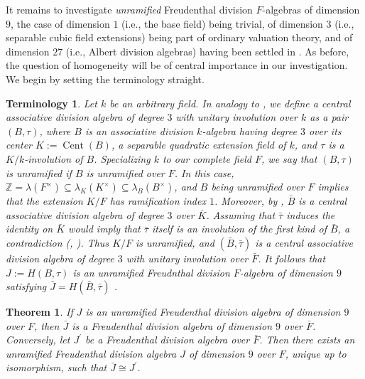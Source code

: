\documentclass{amsart}
\newtheorem{ter}[equation]{Terminology}
\newtheorem{thm}[equation]{Theorem}
\theoremstyle{definition} %
\theoremstyle{remark} %
\DeclareMathOperator{\Cent}{Cent}
\newcommand{\ZZ}{\mathbb{Z}}
\newcommand{\IZ}{\ZZ}
\renewcommand{\:}{\colon\,}
\numberwithin{equation}{section}
\begin{document}
It remains to investigate \emph{unramified} Freudenthal division $F$-algebras of dimension $9$, the case of dimension $1$ (i.e., the base field) being trivial, of dimension $3$ (i.e., separable cubic field extensions) being part of ordinary valuation theory, and of dimension $27$ (i.e., Albert division algebras) having been settled in \cite{MR0379620}. As before, the question of homogeneity will be of central importance in our investigation. We begin by setting the terminology straight.

\begin{ter} \label{t.CEASDI}
\emph{Let $k$ be an arbitrary field. In analogy to \cite[\S4]{MR0379620}, we define a central associative division algebra of degree $3$ with unitary involution over $k$ as a pair $(B,\tau)$, where $B$ is an associative division $k$-algebra having degree $3$ over its center $K := \Cent(B)$, a separable quadratic extension field of $k$, and $\tau$ is a $K/k$-involution of $B$. Specializing $k$ to our complete field $F$, we say that $(B,\tau)$ is \emph{unramified} if $B$ is unramified over $F$. In this case, $\IZ= \lambda(F^\times) \subseteq \lambda_K(K^\times) \subseteq \lambda_B(B^\times)$, and $B$ being unramified over $F$ implies that the extension $K/F$ has ramification index $1$. Moreover, by \cite[Satz~5.2]{MR0347922}, $\bar B$ is a central associative division algebra of degree $3$ over $\bar K$. Assuming that $\bar\tau$ induces the identity on $\bar K$ would imply that $\bar\tau$ itself is an involution of the first kind of $\bar B$, a contradiction (\cite[Chap.~8, Thm.~8.4]{MR770063}, \cite[Prop.~4.5.13]{GilleSz}). Thus $K/F$ is unramified, and $(\bar B,\bar\tau)$ is a central associative division algebra of degree $3$ with unitary involution over $\bar F$. It follows that $J := H(B,\tau)$ is an unramified Freudnthal division $F$-algebra of dimension $9$ satisfying $\bar J = H(\bar B,\bar\tau)$ \cite[Prop.~2]{MR0379620}}.
\end{ter}

\begin{thm} \label{t.UNRALI}
If $J$ is an unramified Freudenthal division algebra of dimension $9$ over $F$, then $\bar J$ is a Freudenthal division algebra of dimension $9$ over $\bar F$. Conversely, let $J^\prime$ be a Freudenthal division algebra over $\bar F$. Then there exists an unramified Freudenthal division algebra $J$ of dimension $9$ over $F$, unique up to isomorphism, such that $\bar J	\cong J^\prime$.
\end{thm}
\end{document}
